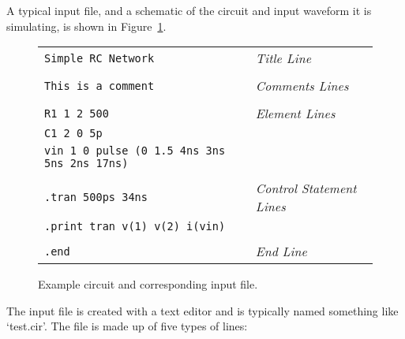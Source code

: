 A typical input file, and a schematic of the circuit and input
waveform it is simulating, is shown in Figure~\ref{input}.
%
\begin{figure}
\centerline{}
\par\noindent
\begin{center}
\begin{tabular}{ll}
{\tt Simple RC Network} & {\em Title Line} \\
{\tt * } & \\
{\tt * This is a comment} & {\em Comments Lines} \\
{\tt * } & \\
{\tt R1 1 2 500} & {\em Element Lines} \\
{\tt C1 2 0 5p } & \\
{\tt vin 1 0 pulse (0 1.5 4ns 3ns 5ns 2ns 17ns)} & \\
{\tt * } & \\
{\tt .tran 500ps 34ns} & {\em Control Statement Lines} \\
{\tt .print tran v(1) v(2) i(vin)} & \\
{\tt * } & \\
{\tt .end} & {\em End Line} 
\end{tabular}
\end{center}
\caption{Example circuit and corresponding input file.}
\label{input}
\end{figure}
%
The input file is created with a text editor  and is typically
named something like `test.cir'.  The file is made up of five
types of lines:
